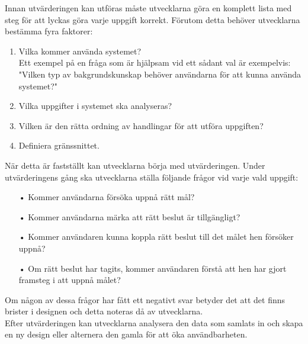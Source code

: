 \documentclass[a4paper, 11pt]{article}
\begin{document}
Innan utvärderingen kan utföras måste utvecklarna göra en komplett lista med steg för att lyckas göra varje uppgift korrekt. Förutom detta behöver utvecklarna bestämma fyra faktorer:
\begin{enumerate}
\item Vilka kommer använda systemet?\\
Ett exempel på en fråga som är hjälpsam vid ett sådant val är exempelvis: "Vilken typ av bakgrundskunskap behöver användarna för att kunna använda systemet?"
\item Vilka uppgifter i systemet ska analyseras?
\item Vilken är den rätta ordning av handlingar för att utföra uppgiften?
\item Definiera gränssnittet.
\end{enumerate}

När detta är fastställt kan utvecklarna börja med utvärderingen. Under utvärderingens gång ska utvecklarna ställa följande frågor vid varje vald uppgift:
\begin{enumerate}
\item[•] Kommer användarna försöka uppnå rätt mål?
\item[•] Kommer användarna märka att rätt beslut är tillgängligt?
\item[•] Kommer användaren kunna koppla rätt beslut till det målet hen försöker uppnå?
\item[•] Om rätt beslut har tagits, kommer användaren förstå att hen har gjort framsteg i att uppnå målet?
\end{enumerate}
Om någon av dessa frågor har fått ett negativt svar betyder det att det finns brister i designen och detta noteras då av utvecklarna.\\

Efter utvärderingen kan utvecklarna analysera den data som samlats in och skapa en ny design eller alternera den gamla för att öka användbarheten.\\ 
\end{document}

